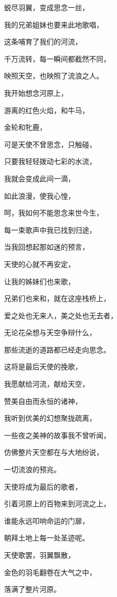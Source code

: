 \documentclass[UTF8]{article}
\begin{document}
\par 蜕尽羽翼，变成思念一丝，
\par 我的兄弟姐妹也要来此地歌唱，
\par 这条哺育了我们的河流，
\par 千万流转，每一瞬间都截然不同，
\par 映照天空，也映照了流浪之人。
\par 我开始想念河原上，
\par 游离的红色火焰，和牛马，
\par 金轮和牝鹿，
\par 可是天使不曾思念，只触碰，
\par 只要我轻轻拨动七彩的水流，
\par 我就会变成此间一滴，
\par 如此浪漫，使我心惶，
\par 呵，我如何不能思念来世今生，
\par 每一束歌声中我已找到归途，
\par 当我回想起那如迷的预言，
\par 天使的心就不再安定，
\par 让我的姊妹们也来歌，
\par 兄弟们也来和，就在这座栈桥上，
\par 爱之处也无来人，美之处也无去者，
\par 无论花朵想与天空争辩什么，
\par 那些流逝的道路都已经走向思念。
\par 这将是最后天使的挽歌，
\par 我愿献给河流，献给天空，
\par 赞美自由而永恒的诸神，
\par 我听到优美的幻想聚拢疏离，
\par 一些夜之美神的故事我不曾听闻，
\par 仿佛整片天空都在与大地纷说，
\par 一切流浪的预兆。
\par 天使将成为最后的歌者，
\par 引着河原上的百物来到河流之上，
\par 谁能永远叩响命运的门扉，
\par 朝拜土地上每一处圣迹呢。
\\[0.6cm]
\par 天使歌罢，羽翼飘散，
\par 金色的羽毛翻卷在大气之中，
\par 落满了整片河原。
\end{document}
